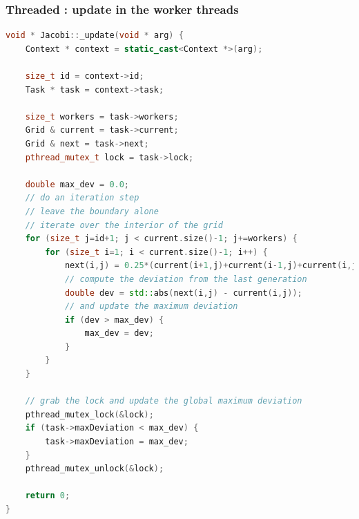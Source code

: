 \begin{frame}[fragile]
% 
  \frametitle{Threaded : update in the worker threads}
%
  \begin{lstlisting}[language=c++,basicstyle=\tt\bfseries\tiny,name=Jacobi:threaded]
void * Jacobi::_update(void * arg) {
    Context * context = static_cast<Context *>(arg);

    size_t id = context->id;
    Task * task = context->task;

    size_t workers = task->workers;
    Grid & current = task->current;
    Grid & next = task->next;
    pthread_mutex_t lock = task->lock;

    double max_dev = 0.0;
    // do an iteration step
    // leave the boundary alone
    // iterate over the interior of the grid
    for (size_t j=id+1; j < current.size()-1; j+=workers) {
        for (size_t i=1; i < current.size()-1; i++) {
            next(i,j) = 0.25*(current(i+1,j)+current(i-1,j)+current(i,j+1)+current(i,j-1));
            // compute the deviation from the last generation
            double dev = std::abs(next(i,j) - current(i,j));
            // and update the maximum deviation
            if (dev > max_dev) {
                max_dev = dev;
            }
        }
    }

    // grab the lock and update the global maximum deviation
    pthread_mutex_lock(&lock);
    if (task->maxDeviation < max_dev) {
        task->maxDeviation = max_dev;
    }
    pthread_mutex_unlock(&lock);

    return 0;
}
  \end{lstlisting}
%
\end{frame}

